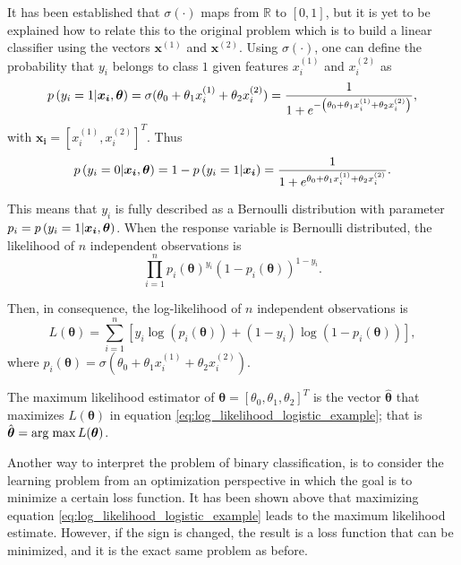 It has been established that $\sigma \left( \cdot \right)$ maps from $\mathbb{R}$ to $\left[ 0,1 \right]$, but it is yet to be explained how to relate this to the original problem which is to build a linear classifier using the vectors $\boldsymbol{x}^{(1)}$ and $\boldsymbol{x}^{(2)}$. Using  $\sigma \left( \cdot \right)$, one can define the probability that $y_i$ belongs to class $1$ given features $x_i^{(1)}$ and $x_i^{(2)}$ as
\begin{equation}
  p\left( y_i = 1 | \boldsymbol{x_i}, \boldsymbol{\theta} \right) = \sigma(\theta_0 + \theta_1 x_i^{(1)} + \theta_2 x_i^{(2)}) = \frac{1}{1 + e^{-\left( \theta_0 + \theta_1 x_i^{(1)} + \theta_2 x_i^{(2)} \right)}},
\end{equation}
with $\boldsymbol{x_i} = \left[ x_i^{(1)}, x_i^{(2)} \right]^T$. Thus
\begin{equation}
  p\left( y_i = 0 | \boldsymbol{x_i}, \boldsymbol{\theta} \right) = 1 - p\left( y_i = 1 | \boldsymbol{x_i} \right) = \frac{1}{1 + e^{\theta_0 + \theta_1 x_i^{(1)} + \theta_2 x_i^{(2)}}}.
\end{equation}

This means that $y_i$ is fully described as a Bernoulli distribution with parameter $p_i =p\left( y_i = 1 | \boldsymbol{x_i}, \boldsymbol{\theta} \right)$. When the response variable is Bernoulli distributed, the likelihood of $n$ independent observations is
\begin{equation}
  \prod_{i = 1}^n  p_i(\boldsymbol{\theta})^{y_i}\left(1 - p_i(\boldsymbol{\theta}) \right)^{1 - y_i}.
\end{equation}

Then, in consequence, the log-likelihood of $n$ independent observations is
\begin{equation}
  \label{eq:log_likelihood_logistic_example}
  L(\boldsymbol{\theta}) = \sum_{i = 1}^n \left[ y_i \log\left( p_i(\boldsymbol{\theta}) \right) + (1 - y_i) \log \left( 1 - p_i(\boldsymbol{\theta}) \right) \right],
\end{equation}
where $p_i(\boldsymbol{\theta}) = \sigma(\theta_0 + \theta_1 x_i^{(1)} + \theta_2 x_i^{(2)})$.

The maximum likelihood estimator of $\boldsymbol{\theta} = \left[ \theta_0, \theta_1, \theta_2 \right]^T$ is the vector $\hat{\boldsymbol{\theta}}$ that maximizes $L(\boldsymbol{\theta})$ in equation \eqref{eq:log_likelihood_logistic_example}; that is $\hat{\boldsymbol{\theta}} = \operatorname*{arg\; max} L(\boldsymbol{\theta})$.

Another way to interpret the problem of binary classification, is to consider the learning problem from an optimization perspective in which the goal is to minimize a certain loss function. It has been shown above that maximizing equation \eqref{eq:log_likelihood_logistic_example} leads to the maximum likelihood estimate. However, if the sign is changed, the result is a loss function that can be minimized, and it is the exact same problem as before.

